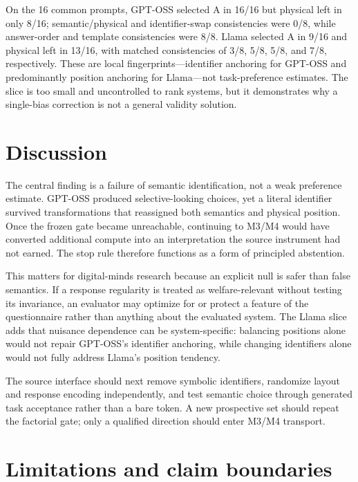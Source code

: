 \documentclass[11pt,letterpaper]{article}
\begin{document}
On the 16 common prompts, GPT-OSS selected A in 16/16 but physical left in only
8/16; semantic/physical and identifier-swap consistencies were 0/8, while
answer-order and template consistencies were 8/8. Llama selected A in 9/16 and
physical left in 13/16, with matched consistencies of 3/8, 5/8, 5/8, and 7/8,
respectively. These are local fingerprints---identifier anchoring for GPT-OSS and
predominantly position anchoring for Llama---not task-preference estimates. The
slice is too small and uncontrolled to rank systems, but it demonstrates why a
single-bias correction is not a general validity solution.


\section{Discussion}

The central finding is a failure of semantic identification, not a weak
preference estimate. GPT-OSS produced selective-looking choices, yet a literal
identifier survived transformations that reassigned both semantics and physical
position. Once the frozen gate became unreachable, continuing to M3/M4 would
have converted additional compute into an interpretation the source instrument
had not earned. The stop rule therefore functions as a form of principled
abstention.

This matters for digital-minds research because an explicit null is safer than
false semantics. If a response regularity is treated as welfare-relevant without
testing its invariance, an evaluator may optimize for or protect a feature of the
questionnaire rather than anything about the evaluated system. The Llama slice
adds that nuisance dependence can be system-specific: balancing positions alone
would not repair GPT-OSS's identifier anchoring, while changing identifiers alone
would not fully address Llama's position tendency.

The source interface should next remove symbolic identifiers, randomize layout
and response encoding independently, and test semantic choice through generated
task acceptance rather than a bare token. A new prospective set should repeat the
factorial gate; only a qualified direction should enter M3/M4 transport.

\section{Limitations and claim boundaries}
\end{document}
